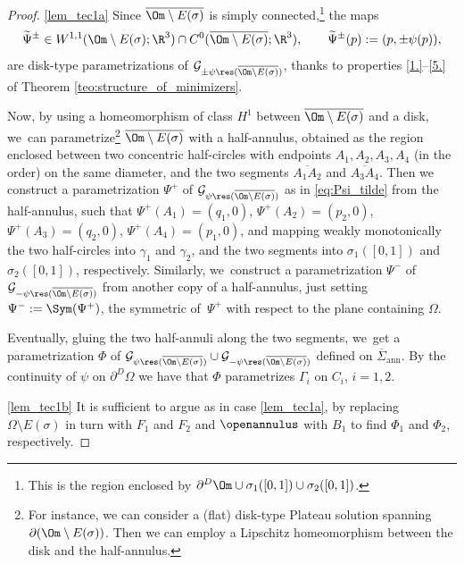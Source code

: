 \skpt
\begin{proof}
\ref{lem_tec1a}
Since $\overline{\Om\setminus E(\sigma)}$ is simply connected,\footnote{ This is the region enclosed by $\partial^D\Om\cup\sigma_1([0,1])\cup\sigma_2([0,1])$.} the
maps
\begin{equation}\label{eq:Psi_tilde}
\widetilde \Psi^\pm\in W^{1,1}({\Om\setminus E(\sigma)};\R^3)
\cap C^0(\overline{\Om\setminus E(\sigma)};\R^3),
\qquad \widetilde \Psi^\pm(p):=(p,\pm\psi(p)),
\end{equation}
are disk-type parametrizations of $\mathcal G_{\pm\psi\res (\overline{\Om\setminus E(\sigma)})}$, thanks to properties \ref{1.}--\ref{5.} of Theorem \ref{teo:structure_of_minimizers}.

Now, by using a homeomorphism of class $H^1$ between $\overline{\Om\setminus E(\sigma)}$ and a disk, we~can parametrize\footnote{For instance,
we can consider a (flat) disk-type Plateau solution
spanning $\partial(\Om\setminus E(\sigma))$.
Then we can employ a Lipschitz homeomorphism between the disk and the
half-annulus.}
$\overline{\Om\setminus E(\sigma)}$ with a half-annulus, obtained as the region enclosed between two concentric half-circles
with endpoints $A_1,A_2,A_3,A_4$ (in the order) on the same diameter, and the two segments $\overline{A_1A_2}$ and $\overline{A_3A_4}$.
Then we construct a parametrization $\Psi^+$
of $\mathcal G_{\psi\res (\overline{\Om\setminus E(\sigma)})}$ as in \eqref{eq:Psi_tilde} from the
half-annulus, such that $\Psi^+(A_1)=(q_1,0)$, $\Psi^+(A_2)=(p_2,0)$, $\Psi^+(A_3)=(q_2,0)$, $\Psi^+(A_4)=(p_1,0)$, and mapping weakly monotonically the two
half-circles
into $\gamma_1$ and $\gamma_2$, and the two segments into $\sigma_1([0,1])$ and
$\sigma_2([0,1])$, respectively.
Similarly, we~construct a parametrization $\Psi^-$ of $\mathcal G_{-\psi\res (\overline{\Om\setminus E(\sigma)})}$ from
another copy of a half-annulus, just
setting $\Psi^-:=\Sym(\Psi^+)$,
the symmetric of~$\Psi^+$ with respect to the plane containing $\Omega$.

Eventually, gluing the two half-annuli
along the two segments, we~get a parametrization $\Phi$
of $\mathcal G_{\psi\res (\overline{\Om\setminus E(\sigma)})}
\cup \mathcal G_{-\psi\res (\overline{\Om\setminus E(\sigma)})}$
defined on $\overline\Sigma_\mathrm{ann}$.
By the continuity of $\psi$ on $\partial^D\Omega$ we have that $ \Phi$ parametrizes $\Gamma_i$ on $C_i$, $i=1,2$.

\ref{lem_tec1b}
It is sufficient to argue as in case \ref{lem_tec1a},
by replacing $\Omega\setminus E(\sigma)$ in turn with $F_1$ and $F_2$ and
$\openannulus$ with $B_1$ to find $\Phi_1$ and $\Phi_2$, respectively.
\end{proof}

